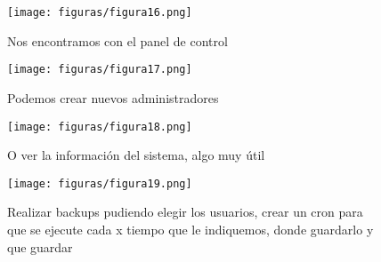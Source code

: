 \begin{figure}[H] %
	\centering
	\texttt{[image: figuras/figura16.png]}  %
	\label{figura16}
	
	\caption{Nos encontramos con el panel de control} 
\end{figure}

\begin{figure}[H] %
	\centering
	\texttt{[image: figuras/figura17.png]}  %
	\label{figura17}
	
	\caption{Podemos crear nuevos administradores} 
\end{figure}

\begin{figure}[H] %
	\centering
	\texttt{[image: figuras/figura18.png]}  %
	\label{figura18}
	
	\caption{O ver la información del sistema, algo muy útil} 
\end{figure}

\begin{figure}[H] %
	\centering
	\texttt{[image: figuras/figura19.png]}  %
	\label{figura19}
	
	\caption{Realizar backups pudiendo elegir los usuarios, crear un cron para que se ejecute cada x tiempo que le indiquemos, donde guardarlo y que guardar} 
\end{figure}


